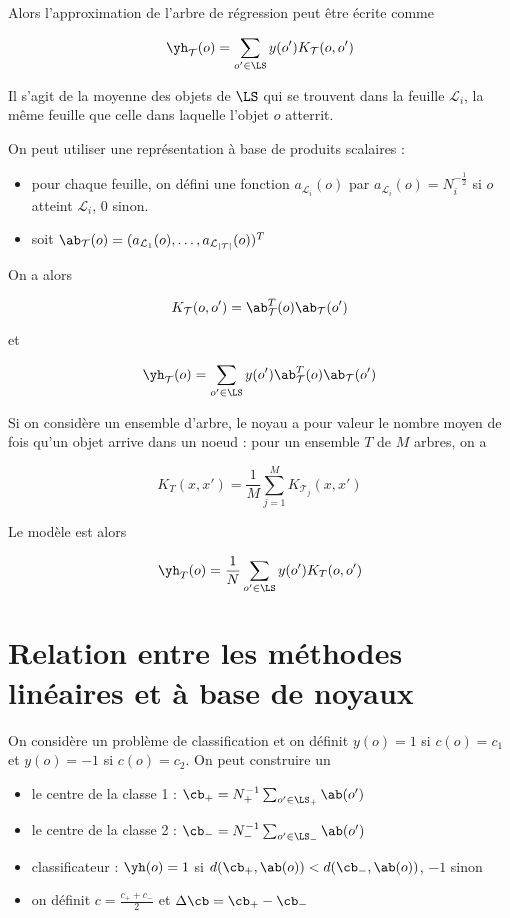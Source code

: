 	Alors l'approximation de l'arbre de régression peut être écrite comme
	
	$$\yh_{\mathcal{T}}(o) = \sum_{o' \in \LS}y(o') K_{\mathcal{T}}(o, o')$$
	
	
	Il s'agit de la moyenne des objets de $\LS$ qui se trouvent dans la feuille $\mathcal{L}_i$, la même feuille que celle dans laquelle l'objet $o$ atterrit.
	
	On peut utiliser une représentation à base de produits scalaires :
	
	\begin{itemize}
		\item pour chaque feuille, on défini une fonction $a_{\mathcal{L}_i}(o)$ par $a_{\mathcal{L}_i}(o) = N_i^{- \frac{1}{2}}$ si $o$ atteint $\mathcal{L}_i$, 0 sinon.
		\item soit $\ab_{\mathcal{T}}(o) = (a_{\mathcal{L}_1}(o), \dots , a_{\mathcal{L}_{\vert \mathcal{T} \vert }}(o))^T$
	\end{itemize}
	
	On a alors
	
	$$K_{\mathcal{T}}(o, o') = \ab_{\mathcal{T}}^T(o) \ab_{\mathcal{T}}(o')$$
	
	et
	
	$$\yh_{\mathcal{T}}(o) = \sum_{o' \in \LS} y(o') \ab_{\mathcal{T}}^T(o) \ab_{\mathcal{T}}(o')$$
	
	Si on considère un ensemble d'arbre, le noyau a pour valeur le nombre moyen de fois qu'un objet arrive dans un noeud : pour un ensemble $T$ de $M$ arbres, on a
	
	$$K_T(x, x') = \frac{1}{M} \sum_{j = 1}^M K_{\mathcal{T}_j}(x, x')$$
	
	Le modèle est alors
	
	$$\yh_T(o) = \frac{1}{N} \sum_{o' \in \LS} y(o') K_T(o, o')$$
	
	\section{Relation entre les méthodes linéaires et à base de noyaux}
	
	On considère un problème de classification et on définit $y(o) = 1$ si $c(o) = c_1$ et $y(o) = -1$ si $c(o) = c_2$. On peut construire un
	
	\begin{itemize}
		\item le centre de la classe 1 : $\cb_+ = N_+^{-1} \sum_{o' \in \LS_+} \ab(o')$
		\item le centre de la classe 2 : $\cb_- = N_-^{-1} \sum_{o' \in \LS_-} \ab(o')$
		\item classificateur : $\yh(o) = 1$ si $d(\cb_+, \ab(o)) < d(\cb_-, \ab(o))$, $-1$ sinon
		\item on définit $c = \frac{c_+ + c_-}{2}$ et $\Delta \cb = \cb_+ - \cb_-$
	\end{itemize}
	
